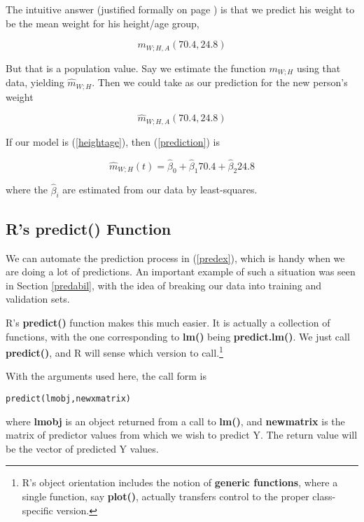 The intuitive answer (justified formally on page \pageref{optimpred}) is
that we predict his weight to be the mean weight for his height/age
group, 

\begin{equation}
m_{W;H,A}(70.4,24.8)
\end{equation}

But that is a population value.  Say we estimate the function $m_{W;H}$
using that data, yielding $\widehat{m}_{W;H}$.  Then we could take as
our prediction for the new person's weight

\begin{equation}
\label{prediction}
\widehat{m}_{W;H,A}(70.4,24.8)
\end{equation}

If our model is (\ref{heightage}), then (\ref{prediction}) is

\begin{equation}
\label{predex}
\widehat{m}_{W;H}(t) = \widehat{\beta}_0 + \widehat{\beta}_1 70.4 + 
\widehat{\beta}_2 24.8
\end{equation}

where the $\widehat{\beta}_i$ are estimated from our data by
least-squares.

\subsection{R's predict() Function}

We can automate the prediction process in (\ref{predex}), which is handy
when we are doing a lot of predictions.  An important example of such a
situation was seen in Section \ref{predabil}, with the idea of breaking
our data into training and validation sets.

R's {\bf predict()} function makes this much easier.  It is actually a
collection of functions, with the one corresponding to {\bf lm()} being
{\bf predict.lm()}.  We just call {\bf predict()}, and R will sense
which version to call.\footnote{R's object orientation includes the
notion of {\bf generic functions}, where a single function, say {\bf
plot()}, actually transfers control to the proper class-specific
version.}

With the arguments used here, the call form is 

\begin{lstlisting}
predict(lmobj,newxmatrix)
\end{lstlisting}

where {\bf lmobj} is an object returned from a call to {\bf lm()}, and
{\bf newmatrix} is the matrix of predictor values from which we wish to
predict Y.  The return value will be the vector of predicted Y values.

